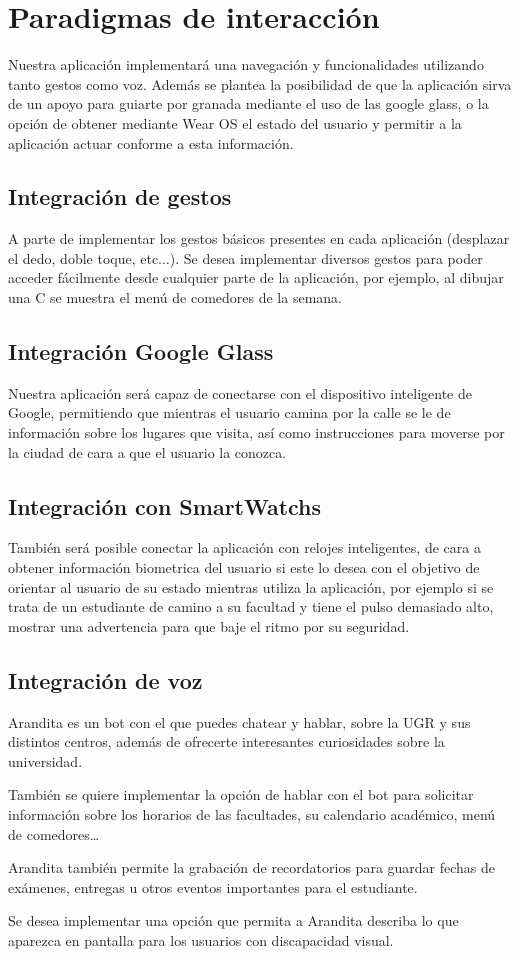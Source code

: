 \section{Paradigmas de interacción}

Nuestra aplicación implementará una navegación y funcionalidades utilizando tanto gestos como voz. Además se plantea la posibilidad de que la aplicación sirva de un apoyo para guiarte por granada mediante el uso de las google glass, o la opción de obtener mediante Wear OS el estado del usuario y permitir a la aplicación actuar conforme a esta información.

\subsection{Integración de gestos}
A parte de implementar los gestos básicos presentes en cada aplicación (desplazar el dedo, doble toque, etc$\ldots$). Se desea implementar diversos gestos para poder acceder fácilmente desde cualquier parte de la aplicación, por ejemplo, al dibujar una C se muestra el menú de comedores de la semana.

\subsection{Integración Google Glass}

Nuestra aplicación será capaz de conectarse con el dispositivo inteligente de Google, permitiendo que mientras el usuario camina por la calle se le de información sobre los lugares que visita, así como instrucciones para moverse por la ciudad de cara a que el usuario la conozca.

\subsection{Integración con SmartWatchs}

También será posible conectar la aplicación con relojes inteligentes, de cara a obtener información biometrica del usuario si este lo desea con el objetivo de orientar al usuario de su estado mientras utiliza la aplicación, por ejemplo si se trata de un estudiante de camino a su facultad y tiene el pulso demasiado alto, mostrar una advertencia para que baje el ritmo por su seguridad.

\subsection{Integración de voz}

Arandita es un bot con el que puedes chatear y hablar, sobre la UGR y sus distintos centros, además de ofrecerte interesantes curiosidades sobre la universidad.

También se quiere implementar la opción de hablar con el bot para solicitar  información sobre los horarios de las facultades, su calendario académico, menú de comedores…

Arandita también permite la grabación de recordatorios para guardar fechas de exámenes, entregas u otros eventos importantes para el estudiante.

Se desea implementar una opción que permita a Arandita describa lo que aparezca en pantalla para los usuarios con discapacidad visual.
